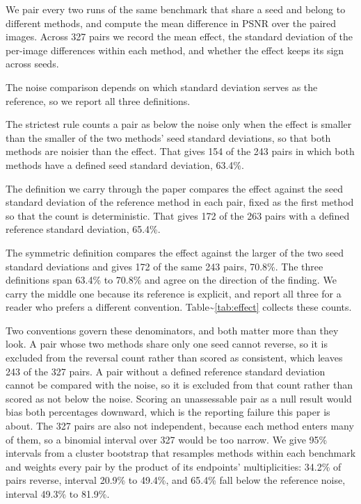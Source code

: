 \documentclass{interact}
\begin{document}
We pair every two runs of the same benchmark that share a seed and belong to different methods, and compute the mean difference in PSNR over the paired images. Across 327 pairs we record the mean effect, the standard deviation of the per-image differences within each method, and whether the effect keeps its sign across seeds.

The noise comparison depends on which standard deviation serves as the reference, so we report all three definitions.

The strictest rule counts a pair as below the noise only when the effect is smaller than the smaller of the two methods' seed standard deviations, so that both methods are noisier than the effect. That gives 154 of the 243 pairs in which both methods have a defined seed standard deviation, 63.4\%.

The definition we carry through the paper compares the effect against the seed standard deviation of the reference method in each pair, fixed as the first method so that the count is deterministic. That gives 172 of the 263 pairs with a defined reference standard deviation, 65.4\%.

The symmetric definition compares the effect against the larger of the two seed standard deviations and gives 172 of the same 243 pairs, 70.8\%. The three definitions span 63.4\% to 70.8\% and agree on the direction of the finding. We carry the middle one because its reference is explicit, and report all three for a reader who prefers a different convention. Table\textasciitilde{}\ref{tab:effect} collects these counts.

Two conventions govern these denominators, and both matter more than they look. A pair whose two methods share only one seed cannot reverse, so it is excluded from the reversal count rather than scored as consistent, which leaves 243 of the 327 pairs. A pair without a defined reference standard deviation cannot be compared with the noise, so it is excluded from that count rather than scored as not below the noise. Scoring an unassessable pair as a null result would bias both percentages downward, which is the reporting failure this paper is about. The 327 pairs are also not independent, because each method enters many of them, so a binomial interval over 327 would be too narrow. We give 95\% intervals from a cluster bootstrap that resamples methods within each benchmark and weights every pair by the product of its endpoints' multiplicities: 34.2\% of pairs reverse, interval 20.9\% to 49.4\%, and 65.4\% fall below the reference noise, interval 49.3\% to 81.9\%.
\end{document}
